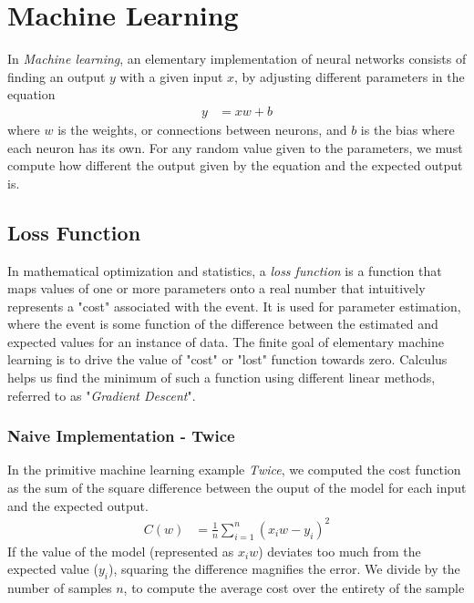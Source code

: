 \documentclass[12pt]{article}
\begin{document}
    \section{Machine Learning}
    In \textit{Machine learning}, an elementary implementation of neural networks consists of finding an output $y$ 
    with a given input $x$, by adjusting different parameters in the equation
    \begin{align} 
        y &= xw + b
    \end{align}
    where $w$ is the weights, or connections between neurons, and $b$ is the bias where each neuron has its own. 
    For any random value given to the parameters, we must compute how different the output given by the equation and 
    the expected output is. 

    \subsection{Loss Function}
    In mathematical optimization and statistics, a \textit{loss function} is a function that maps values of one or more 
    parameters onto a real number that intuitively represents a "cost" associated with the event. It is used for parameter
    estimation, where the event is some function of the difference between the estimated and expected values for an instance 
    of data. The finite goal of elementary machine learning is to drive the value of "cost" or "lost" function towards zero.
    Calculus helps us find the minimum of such a function using different linear methods, referred to as "\textit{Gradient Descent}". 

    \subsubsection{Naive Implementation - Twice}
    In the primitive machine learning example \textit{Twice}, we computed the cost function as the sum of the square difference
    between the ouput of the model for each input and the expected output. 
    \begin{align} 
    C(w) &= \frac{1}{n}\sum_{i=1}^{n}(x_{i}w - y_{i})^2
    \end{align}
    If the value of the model (represented as $x_{i}w$) deviates too much from the expected value ($y_{i}$), squaring the difference 
    magnifies the error. We divide by the number of samples $n$, to compute the average cost over the entirety of the sample 
        
\end{document}
